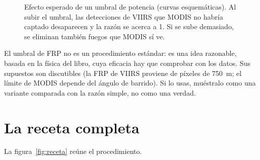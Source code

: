 \begin{figure}[ht]
\centering
{}
\caption{Efecto esperado de un umbral de potencia (curvas esquemáticas). Al subir el umbral, las
detecciones de VIIRS que MODIS no habría captado desaparecen y la razón se acerca a 1. Si se
sube demasiado, se eliminan también fuegos que MODIS sí ve.}
\label{fig:umbral}
\end{figure}

\begin{atencion}
El umbral de FRP no es un procedimiento estándar: es una idea razonable, basada en la física del
libro, cuya eficacia hay que comprobar con los datos. Sus supuestos son discutibles (la FRP de
VIIRS proviene de píxeles de 750~m; el límite de MODIS depende del ángulo de barrido). Si lo
usas, muéstralo como una variante comparada con la razón simple, no como una verdad.
\end{atencion}

\section{La receta completa}

La figura~\ref{fig:receta} reúne el procedimiento.

